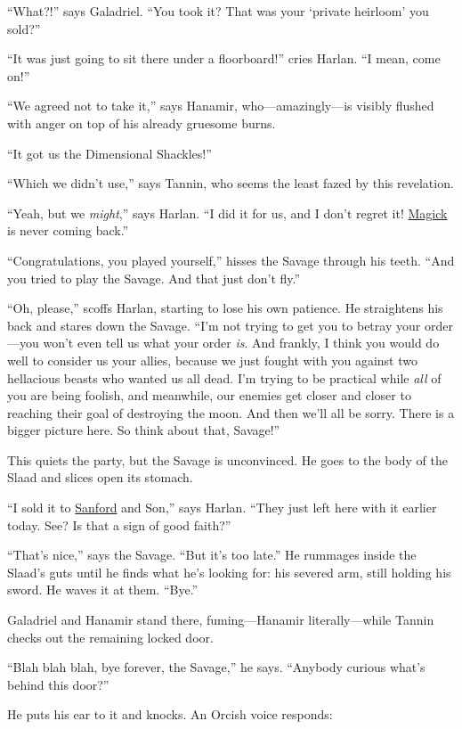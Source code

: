 \documentclass[smalldemyvopaper,11pt,twoside,onecolumn,openright,extrafontsizes]{memoir}
\begin{document}
``What?!'' says Galadriel. ``You took it? That was your `private
heirloom' you sold?''

``It was just going to sit there under a floorboard!'' cries Harlan. ``I
mean, come on!''

``We agreed not to take it,'' says Hanamir, who---amazingly---is visibly
flushed with anger on top of his already gruesome burns.

``It got us the Dimensional Shackles!''

``Which we didn't use,'' says Tannin, who seems the least fazed by this
revelation.

``Yeah, but we \emph{might},'' says Harlan. ``I did it for us, and I
don't regret it! \href{/characters/magick/}{Magick} is never coming
back.''

``Congratulations, you played yourself,'' hisses the Savage through his
teeth. ``And you tried to play the Savage. And that just don't fly.''

``Oh, please,'' scoffs Harlan, starting to lose his own patience. He
straightens his back and stares down the Savage. ``I'm not trying to get
you to betray your order---you won't even tell us what your order
\emph{is}. And frankly, I think you would do well to consider us your
allies, because we just fought with you against two hellacious beasts
who wanted us all dead. I'm trying to be practical while \emph{all} of
you are being foolish, and meanwhile, our enemies get closer and closer
to reaching their goal of destroying the moon. And then we'll all be
sorry. There is a bigger picture here. So think about that, Savage!''

This quiets the party, but the Savage is unconvinced. He goes to the
body of the Slaad and slices open its stomach.

``I sold it to \href{/characters/sanford/}{Sanford} and Son,'' says
Harlan. ``They just left here with it earlier today. See? Is that a sign
of good faith?''

``That's nice,'' says the Savage. ``But it's too late.'' He rummages
inside the Slaad's guts until he finds what he's looking for: his
severed arm, still holding his sword. He waves it at them. ``Bye.''

Galadriel and Hanamir stand there, fuming---Hanamir literally---while
Tannin checks out the remaining locked door.

``Blah blah blah, bye forever, the Savage,'' he says. ``Anybody curious
what's behind this door?''

He puts his ear to it and knocks. An Orcish voice responds:
\end{document}
